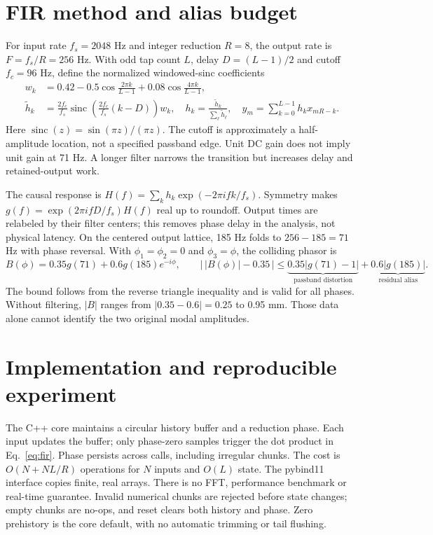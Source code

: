 \documentclass[10pt,a4paper]{article}
\begin{document}
\section{FIR method and alias budget}
For input rate $f_s=2048$ Hz and integer reduction $R=8$, the output rate is
$F=f_s/R=256$ Hz. With odd tap count $L$, delay $D=(L-1)/2$ and cutoff
$f_c=96$ Hz, define the normalized windowed-sinc coefficients~\cite{filter}
\begin{align}
 w_k&=0.42-0.5\cos\frac{2\pi k}{L-1}+0.08\cos\frac{4\pi k}{L-1},\nonumber\\
 \widetilde h_k&=\frac{2f_c}{f_s}\operatorname{sinc}
 \left(\frac{2f_c}{f_s}(k-D)\right)w_k,
 \quad h_k=\frac{\widetilde h_k}{\sum_\ell\widetilde h_\ell},
 \quad y_m=\sum_{k=0}^{L-1}h_k x_{mR-k}.
 \label{eq:fir}
\end{align}
Here $\operatorname{sinc}(z)=\sin(\pi z)/(\pi z)$. The cutoff is approximately
a half-amplitude location, not a specified passband edge. Unit DC gain does not
imply unit gain at 71 Hz. A longer filter narrows the transition but increases
delay and retained-output work.

\newpage
The causal response is $H(f)=\sum_kh_k\exp(-2\pi i f k/f_s)$. Symmetry makes
$g(f)=\exp(2\pi i f D/f_s)H(f)$ real up to roundoff. Output times are relabeled
by their filter centers; this removes phase delay in the analysis, not physical
latency. On the centered output lattice, 185 Hz folds to $256-185=71$ Hz with
phase reversal. With $\phi_1=\phi_2=0$ and $\phi_3=\phi$, the colliding phasor is
\begin{equation}
 B(\phi)=0.35g(71)+0.6g(185)e^{-i\phi},\qquad
 \big|\,|B(\phi)|-0.35\,\big|
 \leq \underbrace{0.35|g(71)-1|}_{\text{passband distortion}}
       +\underbrace{0.6|g(185)|}_{\text{residual alias}}.
 \label{eq:bound}
\end{equation}
The bound follows from the reverse triangle inequality and is valid for all
phases. Without filtering, $|B|$ ranges from $|0.35-0.6|=0.25$ to 0.95 mm.
Those data alone cannot identify the two original modal amplitudes.

\section{Implementation and reproducible experiment}
The C++ core maintains a circular history buffer and a reduction phase. Each
input updates the buffer; only phase-zero samples trigger the dot product in
Eq.~\eqref{eq:fir}. Phase persists across calls, including irregular chunks. The
cost is $O(N+NL/R)$ operations for $N$ inputs and $O(L)$ state. The pybind11
interface copies finite, real arrays. There is no FFT, performance benchmark or
real-time guarantee. Invalid numerical chunks are rejected before state changes;
empty chunks are no-ops, and reset clears both history and phase. Zero prehistory
is the core default, with no automatic trimming or tail flushing.
\end{document}
